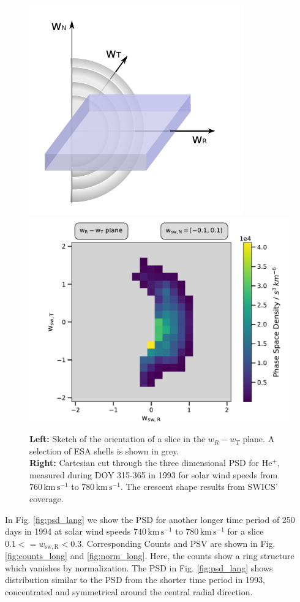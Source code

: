 \begin{figure}[h]
	\includegraphics[width=.34\textwidth]{Figures/sketch_slice_N2.pdf}
	\includegraphics[width=.64\textwidth]{Figures/slice_50_N.pdf}
	\centering
	\caption{\textbf{Left:} Sketch of the orientation of a slice in the $w_R - w_T$ plane. A selection of ESA shells is shown in grey.\\ \textbf{Right:} Cartesian cut through the three dimensional PSD for $\mathrm{He^{+}}$, measured during DOY 315-365 in 1993 for solar wind speeds from $760 \, \mathrm{km\,s^{-1}}$ to $780 \, \mathrm{km\,s^{-1}}$. The crescent shape results from SWICS' coverage.}
	\label{fig:sketch_slice_N}
\end{figure}
%
%
%
%
%
\clearpage
\noindent In Fig. \ref{fig:psd_lang} we show the PSD for another longer time period of 250 days in 1994 at solar wind speeds $740 \, \mathrm{km\,s^{-1}}$ to $780 \, \mathrm{km\,s^{-1}}$ for a slice $0.1 <= w_\mathrm{sw,R} < 0.3$. Corresponding Counts and PSV are shown in Fig. \ref{fig:counts_long} and \ref{fig:norm_long}. Here, the counts show a ring structure which vanishes by normalization. 
The PSD in  Fig. \ref{fig:psd_lang} shows distribution similar to the PSD from the shorter time period in 1993, concentrated and symmetrical around the central radial direction.
